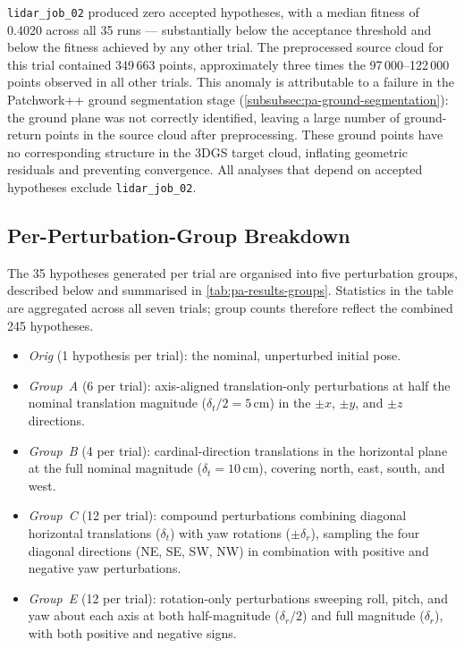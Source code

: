 \texttt{lidar\_job\_02} produced zero accepted hypotheses, with a median fitness of 0.4020 across all 35 runs --- substantially below the acceptance threshold and below the fitness achieved by any other trial. The preprocessed source cloud for this trial contained 349\,663 points, approximately three times the 97\,000--122\,000 points observed in all other trials. This anomaly is attributable to a failure in the Patchwork++ ground segmentation stage (\cref{subsubsec:pa-ground-segmentation}): the ground plane was not correctly identified, leaving a large number of ground-return points in the source cloud after preprocessing. These ground points have no corresponding structure in the 3DGS target cloud, inflating geometric residuals and preventing convergence. All analyses that depend on accepted hypotheses exclude \texttt{lidar\_job\_02}.

\subsection{Per-Perturbation-Group Breakdown}
\label{subsec:pa-results-perturbation-groups}

The 35 hypotheses generated per trial are organised into five perturbation groups, described below and summarised in \cref{tab:pa-results-groups}. Statistics in the table are aggregated across all seven trials; group counts therefore reflect the combined 245 hypotheses.

\begin{itemize}
  \item \emph{Orig} (1 hypothesis per trial): the nominal, unperturbed initial pose.
  \item \emph{Group~A} (6 per trial): axis-aligned translation-only perturbations at half the nominal translation magnitude ($\delta_t / 2 = 5$\,cm) in the $\pm x$, $\pm y$, and $\pm z$ directions.
  \item \emph{Group~B} (4 per trial): cardinal-direction translations in the horizontal plane at the full nominal magnitude ($\delta_t = 10$\,cm), covering north, east, south, and west.
  \item \emph{Group~C} (12 per trial): compound perturbations combining diagonal horizontal translations ($\delta_t$) with yaw rotations ($\pm \delta_r$), sampling the four diagonal directions (NE, SE, SW, NW) in combination with positive and negative yaw perturbations.
  \item \emph{Group~E} (12 per trial): rotation-only perturbations sweeping roll, pitch, and yaw about each axis at both half-magnitude ($\delta_r / 2$) and full magnitude ($\delta_r$), with both positive and negative signs.
\end{itemize}

